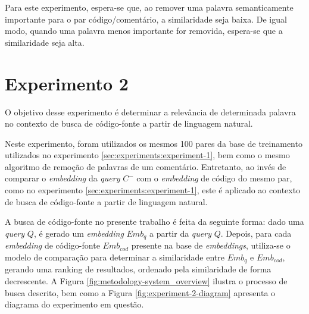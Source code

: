 Para este experimento, espera-se que, ao remover uma palavra semanticamente importante para o par código/comentário, a similaridade seja baixa. De igual modo, quando uma palavra menos importante for removida, espera-se que a similaridade seja alta.

\section{Experimento 2}
\label{sec:experiments:experiment-2}
O objetivo desse experimento é determinar a relevância de determinada palavra no contexto de busca de código-fonte a partir de linguagem natural.

Neste experimento, foram utilizados os mesmos 100 pares da base de treinamento utilizados no experimento \ref{sec:experiments:experiment-1}, bem como o mesmo algoritmo de remoção de palavras de um comentário. Entretanto, ao invés de comparar o \textit{embedding} da \textit{query} $C^-$ com o \textit{embedding} de código do mesmo par, como no experimento \ref{sec:experiments:experiment-1}, este é aplicado ao contexto de busca de código-fonte a partir de linguagem natural.

A busca de código-fonte no presente trabalho é feita da seguinte forma: dado uma \textit{query} $Q$, é gerado um \textit{embedding} $Emb_q$ a partir da \textit{query} $Q$. Depois, para cada \textit{embedding} de código-fonte $Emb_{cod}$ presente na base de \textit{embeddings}, utiliza-se o modelo de comparação para determinar a similaridade entre $Emb_q$ e $Emb_{cod}$, gerando uma ranking de resultados, ordenado pela similaridade de forma decrescente. A Figura \ref{fig:metodology-system_overview} ilustra o processo de busca descrito, bem como a Figura \ref{fig:experiment-2-diagram} apresenta o diagrama do experimento em questão.

